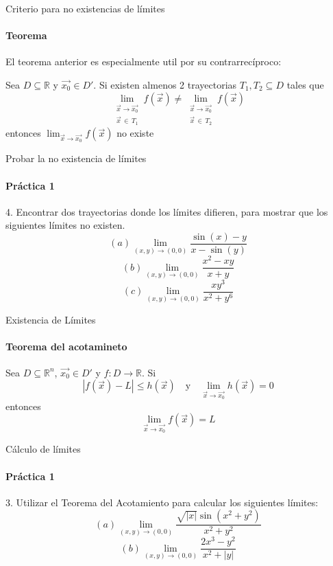 \documentclass{plantillaPPT}
\begin{document}
\begin{frame}{Criterio para no existencias de límites}
\framesubtitle{Teorema}

El teorema anterior es especialmente util por su contrarrecíproco:

\begin{teorema}
    Sea \(D\subseteq\mathbb{R}\) y \(\vec{x_0}\in D'\). Si existen almenos 2 trayectorias \(T_1, T_2\subseteq D\) tales que
    \[
    \lim_{\substack{\vec{x}\to \vec{x_0} \\ \vec{x}\,\in\, T_1}} f(\vec{x}) \neq \lim_{\substack{\vec{x}\to \vec{x_0} \\ \vec{x}\,\in\, T_2}} f(\vec{x})
    \]
    entonces \(\displaystyle\lim_{\vec{x}\to\vec{x_0}}  f(\vec{x})\) no existe
\end{teorema}
    
\end{frame}

\begin{frame}{Probar la no existencia de límites}
\framesubtitle{Práctica 1}

4. Encontrar dos trayectorias donde los límites difieren, para mostrar que los siguientes límites no existen.\\[5pt]
\[
(a) \lim_{(x,y)\to(0,0)} \frac{\sin(x)-y}{x-\sin(y)}
\]
\vspace{5pt}
\[
(b) \lim_{(x,y)\to(0,0)} \frac{x^2-xy}{x+y} 
\]
\vspace{5pt}
\[
(c) \lim_{(x,y)\to(0,0)} \frac{xy^3}{x^2+y^6}
\]
    
\end{frame}

\begin{frame}{Existencia de Límites}
\framesubtitle{Teorema del acotamineto}

\begin{teorema}
    Sea \(D\subseteq\mathbb{R}^n\), \(\vec{x_0}\in D'\) y \(f:D\to\mathbb{R}\). Si
    \[
    |f(\vec{x})-L|\leq h(\vec{x}) \quad \text{y} \quad \lim_{\vec{x}\to\vec{x_0}} h(\vec{x}) = 0
    \]
    entonces
    \[
    \lim_{\vec{x}\to\vec{x_0}} f(\vec{x}) = L
    \]
\end{teorema}
    
\end{frame}

\begin{frame}{Cálculo de límites}
\framesubtitle{Práctica 1}
3. Utilizar el Teorema del Acotamiento para calcular los siguientes límites:\\[5pt]
\[
(a) \lim_{(x,y)\to(0,0)} \frac{\sqrt{|x|}\sin(x^2+y^2)}{x^2+y^2}
\]
\vspace{5pt}
\[
(b) \lim_{(x,y)\to(0,0)} \frac{2x^3-y^2}{x^2+|y|}
\]
    
\end{frame}
\end{document}

